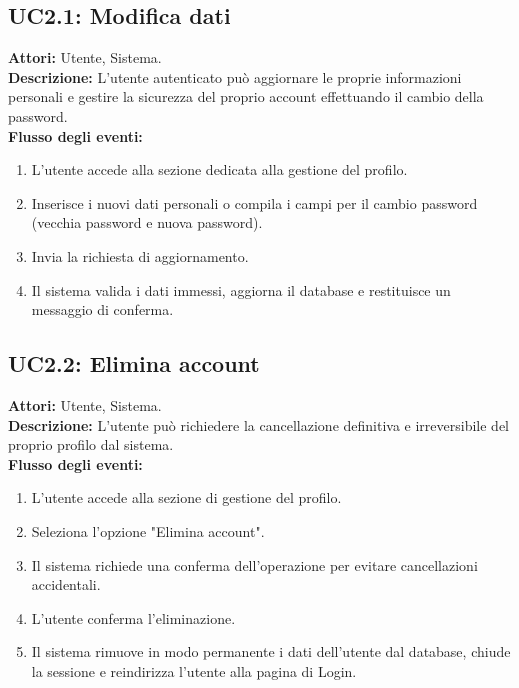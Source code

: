 \subsection*{UC2.1: Modifica dati}
\textbf{Attori:} Utente, Sistema. \\
\textbf{Descrizione:} L'utente autenticato può aggiornare le proprie informazioni personali e gestire la sicurezza del proprio account effettuando il cambio della password. \\
\textbf{Flusso degli eventi:}
\begin{enumerate}
    \item L'utente accede alla sezione dedicata alla gestione del profilo.
    \item Inserisce i nuovi dati personali o compila i campi per il cambio password (vecchia password e nuova password).
    \item Invia la richiesta di aggiornamento.
    \item Il sistema valida i dati immessi, aggiorna il database e restituisce un messaggio di conferma.
\end{enumerate}

\subsection*{UC2.2: Elimina account}
\textbf{Attori:} Utente, Sistema. \\
\textbf{Descrizione:} L'utente può richiedere la cancellazione definitiva e irreversibile del proprio profilo dal sistema. \\
\textbf{Flusso degli eventi:}
\begin{enumerate}
    \item L'utente accede alla sezione di gestione del profilo.
    \item Seleziona l'opzione "Elimina account".
    \item Il sistema richiede una conferma dell'operazione per evitare cancellazioni accidentali.
    \item L'utente conferma l'eliminazione.
    \item Il sistema rimuove in modo permanente i dati dell'utente dal database, chiude la sessione e reindirizza l'utente alla pagina di Login.
\end{enumerate}

